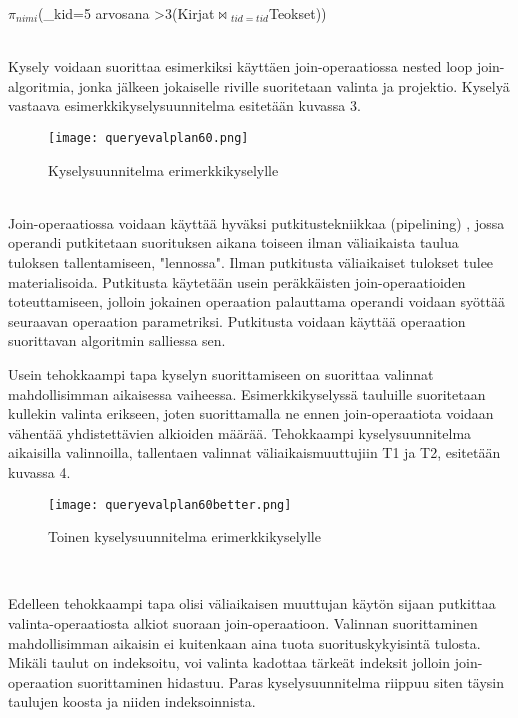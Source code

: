 \documentclass[finnish]{tktltiki2}
\theoremstyle{definition}
\theoremstyle{remark}
\begin{document}
\begin{frame}

$\pi$$_{nimi}$(\sigma_{kid=5 \wedge arvosana \textgreater 3}(Kirjat$\Join$$ _{tid=tid}$Teokset))
\end{frame}
\\\newline
Kysely voidaan suorittaa esimerkiksi käyttäen join-operaatiossa nested loop join-algoritmia, jonka jälkeen jokaiselle riville suoritetaan 
valinta ja projektio. Kyselyä vastaava esimerkkikyselysuunnitelma esitetään kuvassa 3.

\begin{figure}[!h] 
  \caption{Kyselysuunnitelma erimerkkikyselylle}
  \centering
    \texttt{[image: queryevalplan60.png]}
\end{figure}
\\\newline
Join-operaatiossa voidaan käyttää hyväksi putkitustekniikkaa (pipelining) \cite{pipelining}, jossa operandi putkitetaan suorituksen aikana toiseen ilman väliaikaista taulua tuloksen tallentamiseen, "lennossa". Ilman putkitusta väliaikaiset tulokset tulee materialisoida. Putkitusta käytetään usein peräkkäisten join-operaatioiden toteuttamiseen, jolloin jokainen operaation palauttama operandi voidaan syöttää seuraavan operaation parametriksi. Putkitusta voidaan käyttää operaation suorittavan algoritmin salliessa sen.

Usein tehokkaampi tapa kyselyn suorittamiseen on suorittaa valinnat mahdollisimman aikaisessa vaiheessa. Esimerkkikyselyssä tauluille suoritetaan kullekin valinta erikseen, joten suorittamalla ne ennen join-operaatiota voidaan vähentää yhdistettävien alkioiden määrää. Tehokkaampi kyselysuunnitelma aikaisilla valinnoilla, tallentaen valinnat väliaikaismuuttujiin T1 ja T2, esitetään kuvassa 4.

 \begin{figure}[!h] %
  \caption{Toinen kyselysuunnitelma erimerkkikyselylle}
  \centering
    \texttt{[image: queryevalplan60better.png]}
\end{figure}
\\\newline
%

Edelleen tehokkaampi tapa olisi väliaikaisen muuttujan käytön sijaan putkittaa valinta-operaatiosta alkiot suoraan join-operaatioon. Valinnan suorittaminen mahdollisimman aikaisin ei kuitenkaan aina tuota suorituskykyisintä tulosta. \cite{ramakrishnan2003database} Mikäli taulut on indeksoitu, voi valinta kadottaa tärkeät indeksit jolloin join-operaation suorittaminen hidastuu. Paras kyselysuunnitelma riippuu siten täysin taulujen koosta ja niiden indeksoinnista.
\end{document}
